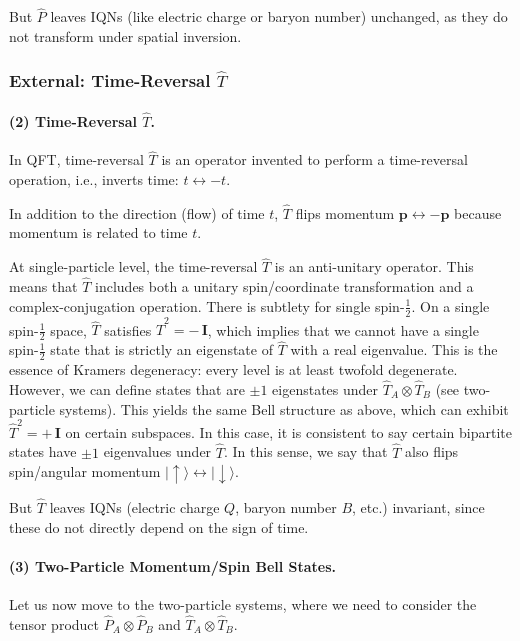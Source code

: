 \documentclass[12pt,a4paper]{article}
\begin{document}
But $\hat{P}$ leaves IQNs (like electric charge or baryon number) unchanged, as they do not transform under spatial inversion.



\subsubsection{External: Time-Reversal $\hat{T}$}

\paragraph{(2) Time-Reversal $\hat{T}$.}
In QFT, time-reversal $\hat{T}$ is an operator invented to perform a time-reversal operation, i.e., inverts time: $t \leftrightarrow -t$.\cite{Wigner1932}


In addition to the direction (flow) of time $t$, $\hat{T}$ flips momentum $\mathbf{p} \leftrightarrow -\mathbf{p}$ because momentum is related to time $t$.


At single-particle level, the time-reversal $\hat{T}$ is an anti‑unitary operator.
This means that $\hat{T}$ includes both a unitary spin/coordinate transformation and a complex-conjugation operation.
There is subtlety for single spin-$\tfrac12$.  
On a single spin-$\tfrac12$ space, $\hat{T}$ satisfies $\hat{T}^2 = -\,\mathbf{I}$, which implies that we cannot have a single spin-$\tfrac12$ state that is strictly an eigenstate of $\hat{T}$ with a real eigenvalue.
This is the essence of Kramers degeneracy: every level is at least twofold degenerate.
However, we can define states that are $\pm1$ eigenstates under $\hat{T}_A \otimes \hat{T}_B$ (see two-particle systems).
This yields the same Bell structure as above, which can exhibit $\hat{T}^2 = +\,\mathbf{I}$ on certain subspaces.
In this case, it is consistent to say certain bipartite states have $\pm1$ eigenvalues under $\hat{T}$.
In this sense, we say that $\hat{T}$ also flips spin/angular momentum $\lvert \uparrow\rangle \leftrightarrow \lvert \downarrow\rangle$.


But $\hat{T}$ leaves IQNs (electric charge $Q$, baryon number $B$, etc.) invariant, since these do not directly depend on the sign of time.


\paragraph{(3) Two-Particle Momentum/Spin Bell States.} Let us now move to the two-particle systems, where we need to consider the tensor product $\hat{P}_A \otimes \hat{P}_B$ and $\hat{T}_A \otimes \hat{T}_B$.
\end{document}
